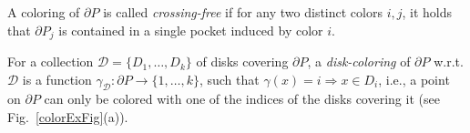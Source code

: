 \documentclass{llncs}
\begin{document}
A coloring of $\partial P$  is called {\em crossing-free} if for any two distinct colors {$i, j$, it holds that $\partial P_j$} is contained in a single pocket induced by color $i$.


For a collection $\mathcal{D} = \{D_1, \ldots, D_k\}$ of disks covering $\partial P$, a \emph{disk-coloring} of $\partial P$ w.r.t. $\mathcal{D}$ is a function $\gamma_{\mathcal{D}}: \partial P \rightarrow \{1, \ldots, k\}$, such that $\gamma(x) = i \Rightarrow x \in  D_i$, i.e., a point on $\partial P$  can only be colored with one of the indices of the disks covering it (see Fig.~\ref{colorExFig}(a)).



\vspace{-15pt}
\end{document}

